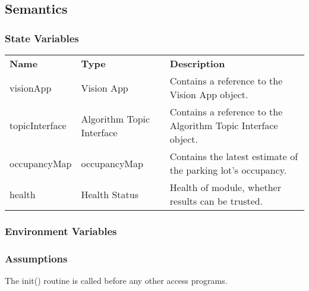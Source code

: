 \documentclass[12pt, titlepage]{article}
\begin{document}
\subsection{Semantics}
\subsubsection{State Variables}
\begin{center}
\begin{tabular}{p{3 cm} p{4cm} p{5cm} }
\hline
\textbf{Name} & \textbf{Type} & \textbf{Description}  \\
visionApp & Vision App & Contains a reference to the Vision App object. \\
topicInterface & Algorithm Topic Interface & Contains a reference to the Algorithm Topic Interface object.\\
occupancyMap & occupancyMap & Contains the latest estimate of the parking lot's occupancy. \\
health & Health Status & Health of module, whether results can be trusted.   \\
\hline
\hline
\end{tabular}
\end{center}
\subsubsection{Environment Variables}
\subsubsection{Assumptions}
The init() routine is called before any other access programs.
\end{document}
